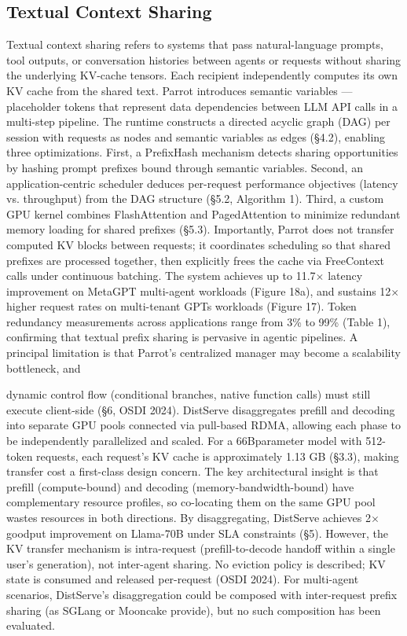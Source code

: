 \documentclass[preprint,12pt]{elsarticle}
\begin{document}
\subsection{Textual Context Sharing}
Textual context sharing refers to systems that pass natural-language prompts, tool outputs, or conversation histories between agents or requests without sharing the underlying KV-cache tensors. Each recipient independently computes its own KV cache from the shared text. Parrot \cite{v5ref17} introduces semantic variables --- placeholder tokens that represent data dependencies between LLM API calls in a multi-step pipeline. The runtime constructs a directed acyclic graph (DAG) per session with requests as nodes and semantic variables as edges (\S{}4.2), enabling three optimizations. First, a PrefixHash mechanism detects sharing opportunities by hashing prompt prefixes bound through semantic variables. Second, an application-centric scheduler deduces per-request performance objectives (latency vs. throughput) from the DAG structure (\S{}5.2, Algorithm 1). Third, a custom GPU kernel combines FlashAttention and PagedAttention to minimize redundant memory loading for shared prefixes (\S{}5.3). Importantly, Parrot does not transfer computed KV blocks between requests; it coordinates scheduling so that shared prefixes are processed together, then explicitly frees the cache via FreeContext calls under continuous batching. The system achieves up to 11.7$\times$ latency improvement on MetaGPT multi-agent workloads (Figure 18a), and sustains 12$\times$ higher request rates on multi-tenant GPTs workloads (Figure 17). Token redundancy measurements across applications range from 3\% to 99\% (Table 1), confirming that textual prefix sharing is pervasive in agentic pipelines. A principal limitation is that Parrot's centralized manager may become a scalability bottleneck, and


dynamic control flow (conditional branches, native function calls) must still execute client-side (\S{}6, OSDI 2024). DistServe \cite{v5ref50} disaggregates prefill and decoding into separate GPU pools connected via pull-based RDMA, allowing each phase to be independently parallelized and scaled. For a 66Bparameter model with 512-token requests, each request's KV cache is approximately 1.13 GB (\S{}3.3), making transfer cost a first-class design concern. The key architectural insight is that prefill (compute-bound) and decoding (memory-bandwidth-bound) have complementary resource profiles, so co-locating them on the same GPU pool wastes resources in both directions. By disaggregating, DistServe achieves 2$\times$ goodput improvement on Llama-70B under SLA constraints (\S{}5). However, the KV transfer mechanism is intra-request (prefill-to-decode handoff within a single user's generation), not inter-agent sharing. No eviction policy is described; KV state is consumed and released per-request (OSDI 2024). For multi-agent scenarios, DistServe's disaggregation could be composed with inter-request prefix sharing (as SGLang or Mooncake provide), but no such composition has been evaluated.
\end{document}

